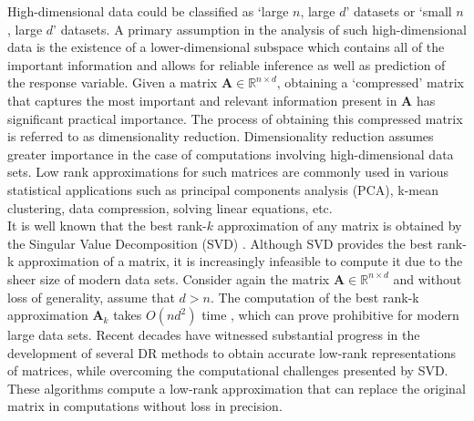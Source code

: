 High-dimensional data could be classified as `large $n$, large $d$' datasets or `small $n$, large $d$' datasets. A primary assumption in the analysis of such high-dimensional data is the existence of a lower-dimensional subspace which contains all of the important information and allows for reliable inference as well as prediction of the response variable. Given a matrix $\boldsymbol{A} \in \boldsymbol{\mathds{R}}^{n \times d}$, obtaining a `compressed' matrix that captures the most important and relevant information present in $\textbf{A}$ has significant practical importance. The process of obtaining this compressed matrix is referred to as dimensionality reduction. Dimensionality reduction assumes greater importance in the case of computations involving high-dimensional data sets. Low rank approximations for such matrices are commonly used in various statistical applications such as principal components analysis (PCA), k-mean clustering, data compression, solving linear equations, etc.   \\

It is well known that the best rank-$k$ approximation of any matrix is obtained by the Singular Value Decomposition (SVD) \cite{eckart_approximation_1936}. Although SVD provides the best rank-k approximation of a matrix, it is increasingly infeasible to compute it due to the sheer size of modern data sets. Consider again the matrix $\boldsymbol{A} \in \boldsymbol{\mathds{R}}^{n \times d}$ and without loss of generality, assume that $d >n$. The computation of the best rank-k approximation $\textbf{A}_k$ takes $O(nd^2)$ time \cite{golub_matrix_2013}, which can prove prohibitive for modern large data sets. Recent decades have witnessed substantial progress in the development of several DR methods to obtain accurate low-rank representations of matrices, while overcoming the computational challenges presented by SVD. These algorithms compute a low-rank approximation that can replace the original matrix in computations without loss in precision.  \\

